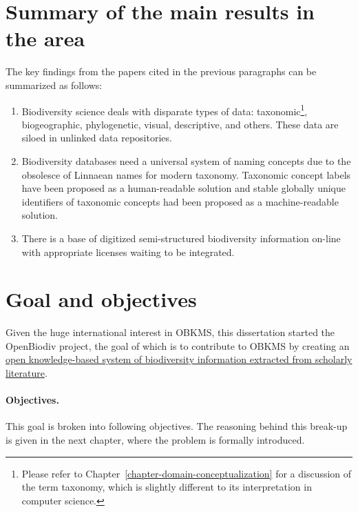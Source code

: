 
\section{Summary of the main results in the area}

The key findings from the papers cited in the previous paragraphs can be summarized as follows:

\begin{enumerate}
  
\item{Biodiversity science deals with disparate types of data: taxonomic\footnote{Please refer to Chapter~\ref{chapter-domain-conceptualization} for a discussion of the term taxonomy, which is slightly different to its interpretation in computer science.}, biogeographic, phylogenetic, visual, descriptive, and others. These data are siloed in unlinked data repositories.}
  
\item{Biodiversity databases need a universal system of naming concepts due to the obsolesce of Linnaean names for modern taxonomy. Taxonomic concept labels have been proposed as a human-readable solution and stable globally unique identifiers of taxonomic concepts had been proposed as a machine-readable solution.}
\item{There is a base of digitized semi-structured biodiversity information on-line with appropriate licenses waiting to be integrated.}
\end{enumerate}


\section{Goal and objectives}

Given the huge international interest in OBKMS, this dissertation started the OpenBiodiv project, the goal of which is to contribute to OBKMS by creating an \ul{open knowledge-based system of biodiversity information extracted from scholarly literature}.

\paragraph{Objectives.} This goal is broken into following objectives. The reasoning behind this break-up is given in the next chapter, where the problem is formally introduced.

